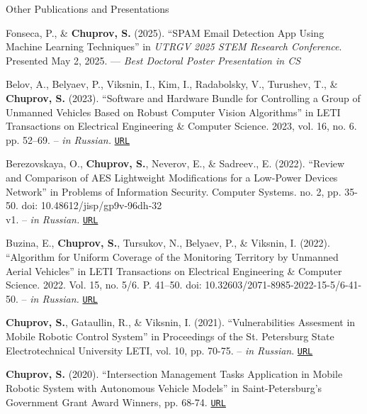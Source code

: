 \begin{rSection}{Other Publications and Presentations}
\begin{enumerate}[label=[O{{\arabic*}]}]
   
\item Fonseca, P., \& \textbf{Chuprov, S.} (2025). ``SPAM Email Detection App Using Machine Learning Techniques'' in \textit{UTRGV 2025 STEM Research Conference}. Presented May 2, 2025. --- \textit{Best Doctoral Poster Presentation in CS}

\item Belov, A., Belyaev, P., Viksnin, I., Kim, I., Radabolsky, V., Turushev, T., \& \textbf{Chuprov, S.} (2023). ``Software and Hardware Bundle for Controlling a Group of Unmanned Vehicles Based on Robust Computer Vision Algorithms'' in LETI Transactions on Electrical Engineering \& Computer Science. 2023, vol. 16, no. 6. pp. 52–69. -- \textit{in Russian.} \href{https://izv.etu.ru/assets/files/izvestiya-6_2023-52-69.pdf}{\nolinkurl{URL}}

\item Berezovskaya, O., \textbf{Chuprov, S.}, Neverov, E., \& Sadreev., E. (2022). ``Review and Comparison of AES Lightweight Modifications for a Low-Power Devices Network'' in Problems of Information Security. Computer Systems. no. 2, pp. 35-50. doi: 10.48612/jisp/gp9v‑96dh‑32\\
v1. -- \textit{in Russian.} \href{https://jisp.ru/article/obzor-i-sravnenie-legkovesnyh-modifikatsij-shifra-aes-dlya-seti-malomoshhnyh-ustrojstv/}{\nolinkurl{URL}}

\item Buzina, E., \textbf{Chuprov, S.}, Tursukov, N., Belyaev, P., \& Viksnin, I. (2022). ``Algorithm for Uniform Coverage of the Monitoring Territory by Unmanned Aerial Vehicles'' in LETI Transactions on Electrical Engineering \& Computer Science. 2022. Vol. 15, no. 5/6. P. 41–50. doi: 10.32603/2071-8985-2022-15-5/6-41-50. -- \textit{in Russian.} \href{https://izv.etu.ru/ru/arhive/2022/5-6/41-50}{\nolinkurl{URL}}

\item \textbf{Chuprov, S.}, Gataullin, R., \& Viksnin, I. (2021). ``Vulnerabilities Assesment in Mobile Robotic Control System'' in Proceedings of the St. Petersburg State Electrotechnical University LETI, vol. 10, pp. 70-75. -- \textit{in Russian}. \href{https://izv.etu.ru/ru/arhive/2021/10/70-75}{\nolinkurl{URL}}

\item \textbf{Chuprov, S.} (2020). ``Intersection Management Tasks Application in Mobile Robotic System with Autonomous Vehicle Models'' in Saint-Petersburg's Government Grant Award Winners, pp. 68-74. \href{https://drive.google.com/file/d/1pG5H6agnzNzFAbElviIHcb7Bj3mRQbco/view?usp=sharing}{\nolinkurl{URL}}


\end{enumerate}
\end{rSection}
